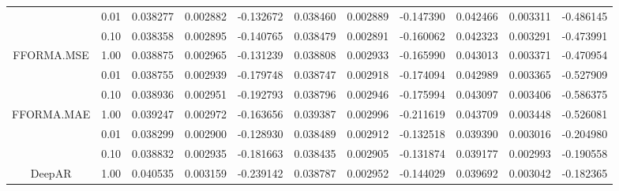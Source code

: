 \begin{longtable}{ccccccccccc}
\cmidrule{1-11}
 & 0.01 & 0.038277 & 0.002882 & -0.132672 & 0.038460 & 0.002889 & -0.147390 & 0.042466 & 0.003311 & -0.486145\\
\cmidrule{2-11}
 & 0.10 & 0.038358 & 0.002895 & -0.140765 & 0.038479 & 0.002891 & -0.160062 & 0.042323 & 0.003291 & -0.473991\\
\cmidrule{2-11}
\multirow{-3}{*}{\centering\arraybackslash FFORMA.MSE} & 1.00 & 0.038875 & 0.002965 & -0.131239 & 0.038808 & 0.002933 & -0.165990 & 0.043013 & 0.003371 & -0.470954\\
\cmidrule{1-11}
 & 0.01 & 0.038755 & 0.002939 & -0.179748 & 0.038747 & 0.002918 & -0.174094 & 0.042989 & 0.003365 & -0.527909\\
\cmidrule{2-11}
 & 0.10 & 0.038936 & 0.002951 & -0.192793 & 0.038796 & 0.002946 & -0.175994 & 0.043097 & 0.003406 & -0.586375\\
\cmidrule{2-11}
\multirow{-3}{*}{\centering\arraybackslash FFORMA.MAE} & 1.00 & 0.039247 & 0.002972 & -0.163656 & 0.039387 & 0.002996 & -0.211619 & 0.043709 & 0.003448 & -0.526081\\
\cmidrule{1-11}
 & 0.01 & 0.038299 & 0.002900 & -0.128930 & 0.038489 & 0.002912 & -0.132518 & 0.039390 & 0.003016 & -0.204980\\
\cmidrule{2-11}
 & 0.10 & 0.038832 & 0.002935 & -0.181663 & 0.038435 & 0.002905 & -0.131874 & 0.039177 & 0.002993 & -0.190558\\
\cmidrule{2-11}
\multirow{-3}{*}{\centering\arraybackslash DeepAR} & 1.00 & 0.040535 & 0.003159 & -0.239142 & 0.038787 & 0.002952 & -0.144029 & 0.039692 & 0.003042 & -0.182365\\*
\end{longtable}
\endgroup{}